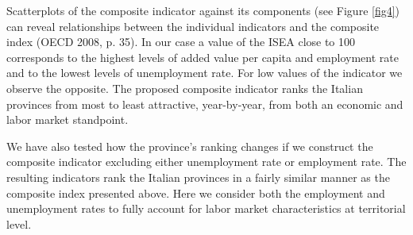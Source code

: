 Scatterplots of the composite indicator against its components (see Figure \ref{fig4}) can reveal relationships between the individual indicators and the composite index (OECD 2008, p. 35). In our case a value of the ISEA close to 100 corresponds to the highest levels of added value per capita and employment rate and to the lowest levels of unemployment rate. For low values of the indicator we observe the opposite. The proposed composite indicator ranks the Italian provinces from most to least attractive, year-by-year, from both an economic and labor market standpoint.

We have also tested how the province's ranking changes if we construct the composite indicator excluding either unemployment rate or employment rate. The resulting indicators rank the Italian provinces in a fairly similar manner as the composite index presented above. Here we consider both the employment and unemployment rates to fully account for labor market characteristics at territorial level.
